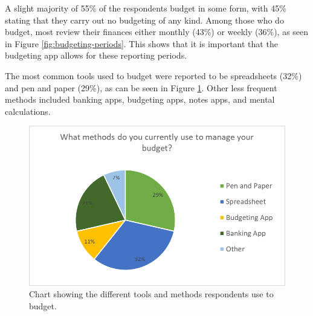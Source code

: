 \documentclass{l4proj}
\begin{document}
\begin{appendices}
A slight majority of 55\% of the respondents budget in some form, with 45\% stating that they carry out no budgeting of any kind. Among those who do budget, most review their finances either monthly (43\%) or weekly (36\%), as seen in Figure \ref{fig:budgeting-periods}. This shows that it is important that the budgeting app allows for these reporting periods.

The most common tools used to budget were reported to be spreadsheets (32\%) and pen and paper (29\%), as can be seen in Figure \ref{fig:methods}. Other less frequent methods included banking apps, budgeting apps, notes apps, and mental calculations.

\begin{figure}
    \centering
    \includegraphics[width=0.5\linewidth]{images/User-Survey/user-survey-charts-methods.png}
    \caption{Chart showing the different tools and methods respondents use to budget.}
    \label{fig:methods}
\end{figure}


\end{appendices}
\end{document}
